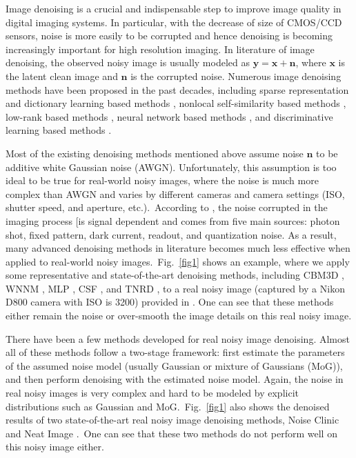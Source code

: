 \documentclass[10pt,twocolumn,letterpaper]{article}
\begin{document}
Image denoising is a crucial and indispensable step to improve image quality in digital imaging systems. In particular, with the decrease of size of CMOS/CCD sensors, noise is more easily to be corrupted and hence denoising is becoming increasingly important for high resolution imaging. In literature of image denoising, the observed noisy image is usually modeled as $\mathbf{y}=\mathbf{x}+\mathbf{n}$, where $\mathbf{x}$ is the latent clean image and $\mathbf{n}$ is the corrupted noise. Numerous image denoising methods \cite{ksvd,lssc,ncsr,nlm,bm3d,cbm3d,pgpd,wnnm,mlp,csf,chen2015learning,foe,epll} have been proposed in the past decades, including sparse representation and dictionary learning based methods \cite{ksvd,lssc,ncsr}, nonlocal self-similarity based methods \cite{nlm,bm3d,cbm3d,ncsr,pgpd}, low-rank based methods \cite{wnnm}, neural network based methods \cite{mlp}, and discriminative learning based methods \cite{csf,chen2015learning}. 

Most of the existing denoising methods \cite{ksvd,lssc,ncsr,nlm,bm3d,cbm3d,pgpd,wnnm,mlp,csf,chen2015learning,foe,epll} mentioned above assume noise $\mathbf{n}$ to be additive white Gaussian noise (AWGN). Unfortunately, this assumption is too ideal to be true for real-world noisy images, where the noise is much more complex than AWGN \cite{crosschannel2016,healey1994radiometric} and varies by different cameras and camera settings (ISO, shutter speed, and aperture, etc.).\ According to \cite{healey1994radiometric}, the noise corrupted in the imaging process [is signal dependent and comes from five main sources: photon shot, fixed pattern, dark current, readout, and quantization noise. As a result, many advanced denoising methods in literature becomes much less effective when applied to real-world noisy images.\ Fig.\ \ref{fig1} shows an example, where we apply some representative and state-of-the-art denoising methods, including CBM3D \cite{cbm3d}, WNNM \cite{wnnm}, MLP \cite{mlp}, CSF \cite{csf}, and TNRD \cite{chen2015learning}, to a real noisy image (captured by a Nikon D800 camera with ISO is 3200) provided in \cite{crosschannel2016}. One can see that these methods either remain the noise or over-smooth the image details on this real noisy image. 

There have been a few methods \cite{crosschannel2016,Liu2008,almapg,Zhu_2016_CVPR,noiseclinic,ncwebsite,neatimage} developed for real noisy image denoising. Almost all of these methods follow a two-stage framework: first estimate the parameters of the assumed noise model (usually Gaussian  or mixture of Gaussians (MoG)), and then perform denoising with the estimated noise model. Again, the noise in real noisy images is very complex and hard to be modeled by explicit distributions such as Gaussian and MoG.\ Fig.\ \ref{fig1} also shows the denoised results of two state-of-the-art real noisy image denoising methods, Noise Clinic \cite{noiseclinic,ncwebsite} and Neat Image \cite{neatimage}.\ One can see that these two methods do not perform well on this noisy image either. 
\end{document}
